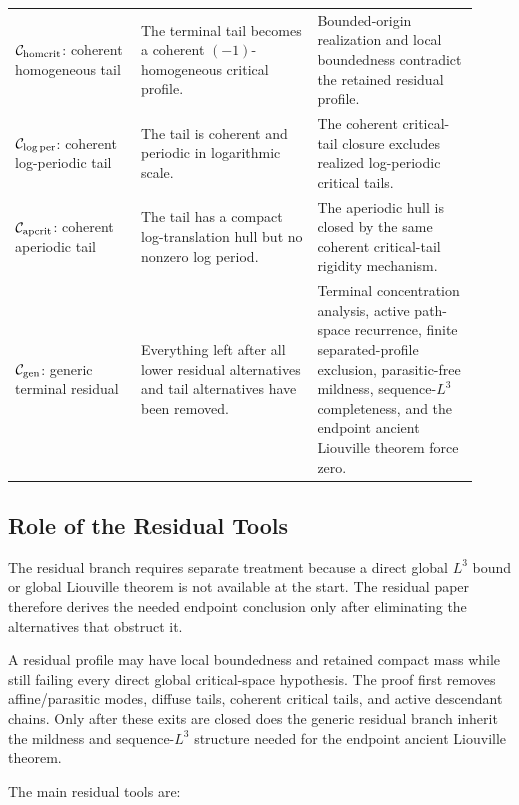 \documentclass[11pt]{amsart}
\begin{document}
\begin{longtable}{@{}>{\raggedright\arraybackslash}p{0.25\linewidth}>{\raggedright\arraybackslash}p{0.35\linewidth}>{\raggedright\arraybackslash}p{0.32\linewidth}@{}}
\(\mathcal C_{\rm homcrit}\): coherent homogeneous tail & The terminal tail becomes a coherent \((-1)\)-homogeneous critical profile. & Bounded-origin realization and local boundedness contradict the retained residual profile. \\
\(\mathcal C_{\log\rm per}\): coherent log-periodic tail & The tail is coherent and periodic in logarithmic scale. & The coherent critical-tail closure excludes realized log-periodic critical tails. \\
\(\mathcal C_{\rm apcrit}\): coherent aperiodic tail & The tail has a compact log-translation hull but no nonzero log period. & The aperiodic hull is closed by the same coherent critical-tail rigidity mechanism. \\
\(\mathcal C_{\rm gen}\): generic terminal residual & Everything left after all lower residual alternatives and tail alternatives have been removed. & Terminal concentration analysis, active path-space recurrence, finite separated-profile exclusion, parasitic-free mildness, sequence-\(L^3\) completeness, and the endpoint ancient Liouville theorem force zero. \\
\bottomrule
\end{longtable}

\subsection{Role of the Residual Tools}

The residual branch requires separate treatment because a direct global \(L^3\) bound or global Liouville theorem is not available at the start.  The residual paper therefore derives the needed endpoint conclusion only after eliminating the alternatives that obstruct it.

A residual profile may have local boundedness and retained compact mass while still failing every direct global critical-space hypothesis.  The proof first removes affine/parasitic modes, diffuse tails, coherent critical tails, and active descendant chains.  Only after these exits are closed does the generic residual branch inherit the mildness and sequence-\(L^3\) structure needed for the endpoint ancient Liouville theorem.

The main residual tools are:
\end{document}
